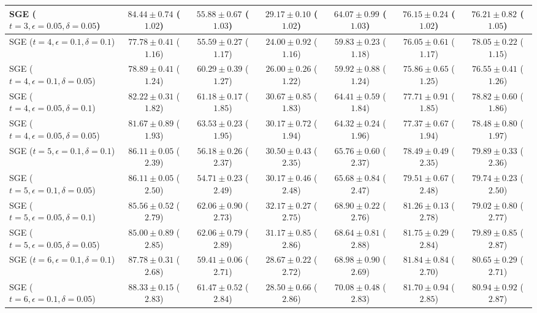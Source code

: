 \documentclass[journal]{IEEEtran}
\theoremstyle{definition}
\begin{document}
\begin{table*}[!htbp]
\begin{center}
{\begin{tabular}{|l|c|c|c|c|c|c|}
SGE ($t=3, \epsilon = 0.05, \delta = 0.05$) & $84.44\pm 0.74$ ($1.02$) & $55.88\pm 0.67$ ($1.03$) & $29.17\pm 0.10$ ($1.02$) & $64.07\pm 0.99$ ($1.03$) & $76.15\pm 0.24$ ($1.02$) & $76.21\pm 0.82$ ($1.05$)\\
\hline
SGE ($t=4, \epsilon = 0.1, \delta = 0.1$) & $77.78\pm 0.41$ ($1.16$) & $55.59\pm 0.27$ ($1.17$) & $24.00\pm 0.92$ ($1.16$) & $59.83\pm 0.23$ ($1.18$) & $76.05\pm 0.61$ ($1.17$) & $78.05\pm 0.22$ ($1.15$) \\
SGE ($t=4, \epsilon = 0.1, \delta = 0.05$) & $78.89\pm 0.41$ ($1.24$) & $60.29\pm 0.39$ ($1.27$) & $26.00\pm 0.26$ ($1.22$) & $59.92\pm 0.88$ ($1.24$) & $75.86\pm 0.65$ ($1.25$) & $76.55\pm 0.41$ ($1.26$) \\
SGE ($t=4, \epsilon = 0.05, \delta = 0.1$) & $82.22\pm 0.31$ ($1.82$) & $61.18\pm 0.17$ ($1.85$) & $30.67\pm 0.85$ ($1.83$) & $64.41\pm 0.59$ ($1.84$) & $77.71\pm 0.91$ ($1.85$) & $78.82\pm 0.60$ ($1.86$) \\
SGE ($t=4, \epsilon = 0.05, \delta = 0.05$) & $81.67\pm 0.89$ ($1.93$) & $\mathbf{63.53\pm 0.23}$ ($1.95$) & $30.17\pm 0.72$ ($1.94$) & $64.32\pm 0.24$ ($1.96$) & $77.37\pm 0.67$ ($1.94$) & $78.48\pm 0.80$ ($1.97$) \\
\hline
SGE ($t=5, \epsilon = 0.1, \delta = 0.1$) & $86.11\pm 0.05$ ($2.39$) & $56.18\pm 0.26$ ($2.37$) & $30.50\pm 0.43$ ($2.35$) & $65.76\pm 0.60$ ($2.37$) & $78.49\pm 0.49$ ($2.35$) & $79.89\pm 0.33$ ($2.36$) \\
SGE ($t=5, \epsilon = 0.1, \delta = 0.05$) & $86.11\pm 0.05$ ($2.50$) & $54.71\pm 0.23$ ($2.49$) & $30.17\pm 0.46$ ($2.48$) & $65.68\pm 0.84$ ($2.47$) & $79.51\pm 0.67$ ($2.48$) & $79.74\pm 0.23$ ($2.50$) \\
SGE ($t=5, \epsilon = 0.05, \delta = 0.1$) & $85.56\pm 0.52$ ($2.79$) & $62.06\pm 0.90$ ($2.73$) & $32.17\pm 0.27$ ($2.75$) & $68.90\pm 0.22$ ($2.76$) & $81.26\pm 0.13$ ($2.78$) & $79.02\pm 0.80$ ($2.77$) \\
SGE ($t=5, \epsilon = 0.05, \delta = 0.05$) & $85.00\pm 0.89$ ($2.85$) & $62.06\pm 0.79$ ($2.89$) & $31.17\pm 0.85$ ($2.86$) & $68.64\pm 0.81$ ($2.88$) & $81.75\pm 0.29$ ($2.84$) & $79.89\pm 0.85$ ($2.87$) \\
\hline
SGE ($t=6, \epsilon = 0.1, \delta = 0.1$) & $87.78\pm 0.31$ ($2.68$) & $59.41\pm 0.06$ ($2.71$) & $28.67\pm 0.22$ ($2.72$) & $68.98\pm 0.90$ ($2.69$) & $81.84\pm 0.84$ ($2.70$) & $80.65\pm 0.29$ ($2.71$) \\
SGE ($t=6, \epsilon = 0.1, \delta = 0.05$) & $88.33\pm 0.15$ ($2.83$) & $61.47\pm 0.52$ ($2.84$) & $28.50\pm 0.66$ ($2.86$) & $70.08\pm 0.48$ ($2.83$) & $81.70\pm 0.94$ ($2.85$) & $80.94\pm 0.92$ ($2.87$) \\

\end{tabular}}
\end{center}
\end{table*}
\end{document}
